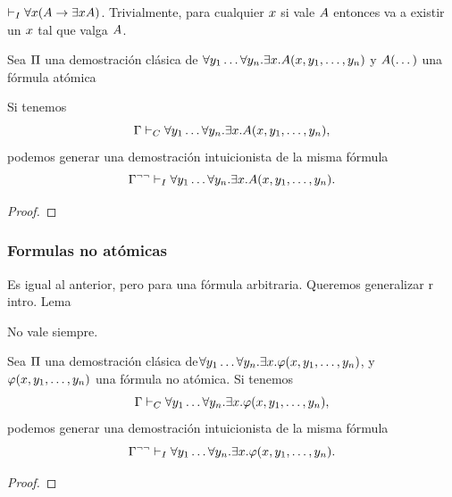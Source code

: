 \begin{obs}\label{fri:obs:forall-exists}
    $\vdash_I \forall x (A \rightarrow \exists x A)$.
    Trivialmente, para cualquier $x$ si vale $A$ entonces va a existir un $x$ tal que valga $A$.
\end{obs}



\begin{theorem}
    \label{fri:thm:fri-pitwo}

    Sea $\Pi$ una demostración clásica de
    \(
        \forall y_1 \dots \forall y_n .
        \exists x .
        A(x, y_1, \dots, y_n)
    \)
    y $A(\dots)$ una fórmula atómica

    Si tenemos
    \[
        \Gamma \vdash_C
        \forall y_1 \dots \forall y_n .
        \exists x .
        A(x, y_1, \dots, y_n),
    \]
    podemos generar una demostración intuicionista de la misma fórmula
    \[
        \Gamma^{\neg\neg} \vdash_I
        \forall y_1 \dots \forall y_n .
        \exists x .
        A(x, y_1, \dots, y_n).
    \]
\end{theorem}
\begin{proof}
\end{proof}

\subsubsection{Formulas no atómicas}
Es igual al anterior, pero para una fórmula arbitraria. Queremos generalizar r intro. Lema

\begin{lemma}
    No vale siempre.
\end{lemma}

\begin{theorem}
    \label{fri:thm:fri-pitwo-general}

    Sea $\Pi$ una demostración clásica de\(
        \forall y_1 \dots \forall y_n .
        \exists x .
        \varphi(x, y_1, \dots, y_n)
    \), y
    $\varphi(x, y_1, \dots, y_n)$ una fórmula no atómica.
    Si tenemos
    \[
        \Gamma \vdash_C 
        \forall y_1 \dots \forall y_n .
        \exists x .
        \varphi(x, y_1, \dots, y_n),
    \]
    podemos generar una demostración intuicionista de la misma fórmula
    \[
        \Gamma^{\neg\neg} \vdash_I
        \forall y_1 \dots \forall y_n .
        \exists x .
        \varphi(x, y_1, \dots, y_n).
    \]
\end{theorem}
\begin{proof}
    \todo{}
\end{proof}

